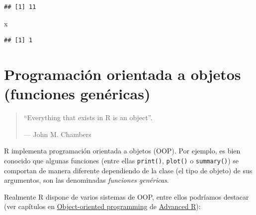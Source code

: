 \documentclass[
]{book}
\newenvironment{Shaded}{\begin{snugshade}}{\end{snugshade}}
\newcommand{\NormalTok}[1]{#1}
\theoremstyle{break}
\theoremstyle{nonumberplain}
\begin{document}
\begin{verbatim}
## [1] 11
\end{verbatim}

\begin{Shaded}
\begin{Highlighting}[]
\NormalTok{x}
\end{Highlighting}
\end{Shaded}

\begin{verbatim}
## [1] 1
\end{verbatim}

\hypertarget{oop}{%
\section{Programación orientada a objetos (funciones genéricas)}\label{oop}}

\begin{quote}
``Everything that exists in R is an object''.

--- John M. Chambers
\end{quote}

R implementa programación orientada a objetos (OOP).
Por ejemplo, es bien conocido que algunas funciones (entre ellas \texttt{print()}, \texttt{plot()} o \texttt{summary()}) se comportan de manera diferente dependiendo de la clase (el tipo de objeto) de sus argumentos, son las denominadas \emph{funciones genéricas}.

Realmente R dispone de varios sistemas de OOP, entre ellos podríamos destacar (ver capítulos en \href{https://adv-r.hadley.nz/oo.html}{Object-oriented programming} de \href{https://adv-r.hadley.nz}{Advanced R}):
\end{document}
